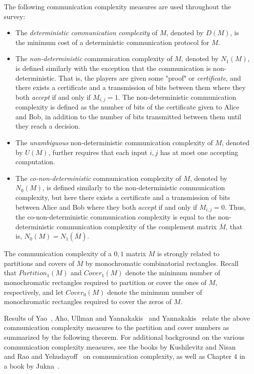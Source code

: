\documentclass[11pt]{article}
\begin{document}
The following communication complexity measures are used throughout the survey:
\begin{itemize}
\item
The {\em deterministic communication complexity} of $M$, denoted by $D(M)$,
is the minimum cost of a deterministic communication protocol for $M$.
\item
The {\em non-deterministic} communication complexity of $M$, denoted by $N_1(M)$, is defined similarly with the exception that the communication is non-deterministic.
That is, the players are given some "proof" or {\em certificate},
and  there exists a certificate and a transmission of bits between them where they both {\em accept} if and only if $M_{i,j}=1$.
The non-deterministic communication complexity is defined as the number of bits of the certificate given to Alice and Bob, in addition to the number of bits transmitted between them until they reach a decision.
\item
The {\em unambiguous} non-deterministic communication complexity of $M$, denoted by $U(M)$, further requires
that each input $i,j$ has at most one accepting computation.
\item The {\em co-non-deterministic} communication complexity of $M$, denoted by $N_0(M)$, is defined similarly to the non-deterministic communication complexity,
but here there exists a certificate and a transmission of bits between Alice and Bob where they both {\em accept} if and only if $M_{i,j}=0$.
Thus, the co-non-deterministic communication complexity is equal to the non-deterministic communication complexity of the complement matrix $\overline{M}$, that is, $N_0(M) = N_1(\overline{M})$.
\end{itemize}
The communication complexity of a $0,1$ matrix $M$ is strongly related to partitions and covers of $M$ by monochromatic combinatorial rectangles.
Recall that $Partition_1(M)$ and $Cover_1(M)$ denote the minimum number of monochromatic rectangles required to partition or cover the ones of $M$, respectively,
and let $Cover_0(M)$ denote the minimum number of monochromatic rectangles required to cover the zeros of $M$.

Results of Yao~\cite{Yao79}, Aho, Ullman and Yannakakis~\cite{aho1983notions} and  Yannakakis~\cite{Yannakakis91}
relate the above communication complexity measures to the partition and cover numbers as  summarized by the following theorem.
For additional background on the various communication complexity measures, see the books by Kushilevitz and Nisan~\cite{KN97} and Rao and Yehudayoff~\cite{rao2020communication}
on communication complexity, as well as Chapter 4 in a book by Jukna~\cite{jukna2012boolean}.
\end{document}
